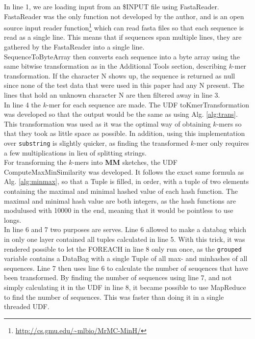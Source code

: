 \documentclass[../../main.tex]{subfiles}
\begin{document}
In line 1, we are loading input from an \$INPUT file using FastaReader. FastaReader was the only function not developed by the author, and is an open source input reader function\footnote{\url{http://cs.gmu.edu/~mlbio/MrMC-MinH/}} which can read fasta files so that each sequence is read as a single line. This means that if sequences span multiple lines, they are gathered by the FastaReader into a single line.\\

SequenceToByteArray then converts each sequence into a byte array using the same bitwise transformation as in the Additional Tools section, describing $k$-mer transformation. If the character N shows up, the sequence is returned as null since none of the test data that were used in this paper had any N present. The lines that hold an unknown character N are then filtered away in line 3.\\

In line 4 the $k$-mer for each sequence are made. The UDF toKmerTransformation was developed so that the output would be the same as using Alg. \ref{alg:trans}. This transformation was used as it was the optimal way of obtaining $k$-mers so that they took as little space as possible. In addition, using this implementation over \texttt{substring} is slightly quicker, as finding the transformed $k$-mer only requires a few multiplications in lieu of splitting strings.\\ 

For transforming the $k$-mers into {\bf MM} sketches, the UDF ComputeMaxMinSimilarity was developed. It follows the exact same formula as Alg. \ref{alg:minmax}, so that a Tuple is filled, in order, with a tuple of two elements containing the maximal and minimal hashed value of each hash function. The maximal and minimal hash value are both integers, as the hash functions are modulused with 10000 in the end, meaning that it would be pointless to use longs.\\

In line 6 and 7 two purposes are serves. Line 6 allowed to make a databag which in only one layer contained all tuples calculated in line 5. With this trick, it was rendered possible to let the FOREACH in line 8 only run once, as the \texttt{grouped} variable contains a DataBag with a single Tuple of all max- and minhashes of all sequences. Line 7 then uses line 6 to calculate the number of seuqences that have been transformed. By finding the number of sequences using line 7, and not simply calculating it in the UDF in line 8, it became possible to use MapReduce to find the number of sequences. This was faster than doing it in a single threaded UDF.\\
\end{document}
